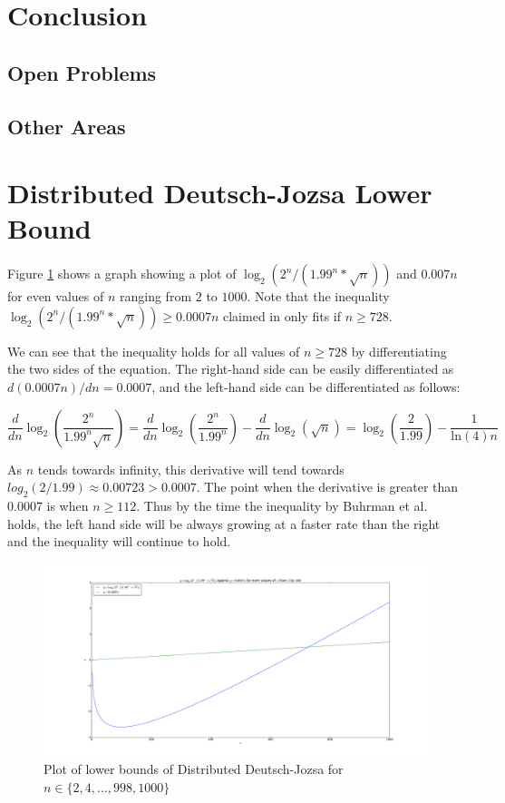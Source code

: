 \documentclass[a4paper]{article}
\begin{document}
    \section{Conclusion}
    \label{sec:conclusion}

        \subsection{Open Problems}

        \subsection{Other Areas}

    
    {}

    \appendix
    \section{Distributed Deutsch-Jozsa Lower Bound}
    \label{sec:ddj-lower-bound}

        Figure \ref{fig:ddj-bound} shows a graph showing a plot of $\log_2(2^n/(1.99^n*\sqrt{n}))$ and $0.007n$ for even values of $n$ ranging from $2$ to $1000$. Note that the inequality $\log_2(2^n/(1.99^n*\sqrt{n})) \geq 0.0007n$ claimed in \cite{RevModPhys.82.665} only fits if $n \geq 728$.

        We can see that the inequality holds for all values of $n \geq 728$ by differentiating the two sides of the equation. The right-hand side can be easily differentiated as $d(0.0007n)/dn = 0.0007$, and the left-hand side can be differentiated as follows:

        $$\frac{d}{dn}\log_2\left(\frac{2^n}{1.99^n\sqrt{n}}\right) = \frac{d}{dn}\log_2\left(\frac{2^n}{1.99^n}\right) - \frac{d}{dn}\log_2(\sqrt{n}) = \log_2\left(\frac{2}{1.99}\right) - \frac{1}{\textrm{ln}(4)n}$$

        As $n$ tends towards infinity, this derivative will tend towards $log_2(2/1.99) \approx 0.00723 > 0.0007$. The point when the derivative is greater than 0.0007 is when $n \geq 112$. Thus by the time the inequality by Buhrman et al.~ holds, the left hand side will be always growing at a faster rate than the right and the inequality will continue to hold.

        \begin{figure}
            \includegraphics[width=\linewidth]{ddj_bound}
            \caption{Plot of lower bounds of Distributed Deutsch-Jozsa for $n \in \{2, 4,..., 998, 1000\}$}
            \label{fig:ddj-bound}
        \end{figure}
\end{document}
